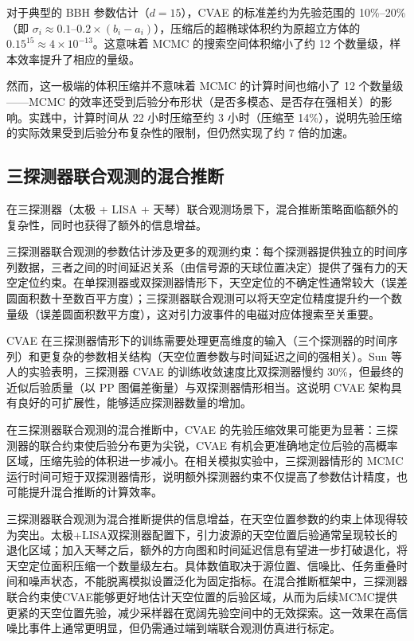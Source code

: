对于典型的 BBH 参数估计（$d = 15$），CVAE 的标准差约为先验范围的 10\%--20\%（即 $\sigma_i \approx 0.1$--$0.2 \times (b_i - a_i)$），压缩后的超椭球体积约为原超立方体的 $0.15^{15} \approx 4 \times 10^{-13}$。这意味着 MCMC 的搜索空间体积缩小了约 12 个数量级，样本效率提升了相应的量级。

然而，这一极端的体积压缩并不意味着 MCMC 的计算时间也缩小了 12 个数量级——MCMC 的效率还受到后验分布形状（是否多模态、是否存在强相关）的影响。实践中，计算时间从 22 小时压缩至约 3 小时（压缩至 14\%），说明先验压缩的实际效果受到后验分布复杂性的限制，但仍然实现了约 7 倍的加速。

\subsection{三探测器联合观测的混合推断}

在三探测器（太极 + LISA + 天琴）联合观测场景下，混合推断策略面临额外的复杂性，同时也获得了额外的信息增益。

三探测器联合观测的参数估计涉及更多的观测约束：每个探测器提供独立的时间序列数据，三者之间的时间延迟关系（由信号源的天球位置决定）提供了强有力的天空定位约束。在单探测器或双探测器情形下，天空定位的不确定性通常较大（误差圆面积数十至数百平方度）；三探测器联合观测可以将天空定位精度提升约一个数量级（误差圆面积数平方度），这对引力波事件的电磁对应体搜索至关重要。

CVAE 在三探测器情形下的训练需要处理更高维度的输入（三个探测器的时间序列）和更复杂的参数相关结构（天空位置参数与时间延迟之间的强相关）。Sun 等人的实验表明，三探测器 CVAE 的训练收敛速度比双探测器慢约 30\%，但最终的近似后验质量（以 PP 图偏差衡量）与双探测器情形相当。这说明 CVAE 架构具有良好的可扩展性，能够适应探测器数量的增加。

在三探测器联合观测的混合推断中，CVAE 的先验压缩效果可能更为显著：三探测器的联合约束使后验分布更为尖锐，CVAE 有机会更准确地定位后验的高概率区域，压缩先验的体积进一步减小。在相关模拟实验中，三探测器情形的 MCMC 运行时间可短于双探测器情形，说明额外探测器约束不仅提高了参数估计精度，也可能提升混合推断的计算效率。

三探测器联合观测为混合推断提供的信息增益，在天空位置参数的约束上体现得较为突出。太极+LISA双探测器配置下，引力波源的天空位置后验通常呈现较长的退化区域；加入天琴之后，额外的方向图和时间延迟信息有望进一步打破退化，将天空定位面积压缩一个数量级左右。具体数值取决于源位置、信噪比、任务重叠时间和噪声状态，不能脱离模拟设置泛化为固定指标。在混合推断框架中，三探测器联合约束使CVAE能够更好地估计天空位置的后验区域，从而为后续MCMC提供更紧的天空位置先验，减少采样器在宽阔先验空间中的无效探索。这一效果在高信噪比事件上通常更明显，但仍需通过端到端联合观测仿真进行标定。

